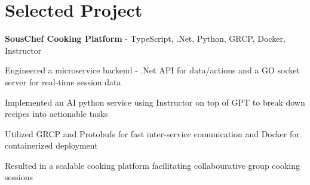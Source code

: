 \vspace{5 pt - 0.5 cm}
\section{Selected Project}
\begin{onecolentry}
\textbf{SousChef Cooking Platform} - TypeScript, .Net, Python, GRCP, Docker, Instructor 
\end{onecolentry}

\vspace{0.10 cm}
\begin{onecolentry}
    \begin{highlights}
        \item Engineered a microservice backend - .Net API for data/actions and a GO socket server for real-time session data
        \item Implemented an AI python service using Instructor on top of GPT to break down recipes into actionable tasks
        \item Utilized GRCP and Protobufs for fast inter-service comunication and Docker for containerized deployment
        \item Resulted in a scalable cooking platform facilitating collabourative group cooking sessions
    \end{highlights}
\end{onecolentry}
